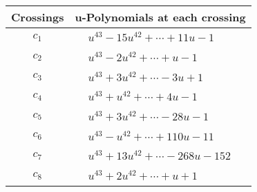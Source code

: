 \documentclass[1p]{elsarticle_modified}
\theoremstyle{definition}
\begin{document}
\begin{tabular}{m{50pt}|m{274pt}}
Crossings & \hspace{64pt}u-Polynomials at each crossing \\
\hline $$\begin{aligned}c_{1}\end{aligned}$$&$\begin{aligned}
&u^{43}-15 u^{42}+\cdots+11 u-1
\end{aligned}$\\
\hline $$\begin{aligned}c_{2}\end{aligned}$$&$\begin{aligned}
&u^{43}-2 u^{42}+\cdots+u-1
\end{aligned}$\\
\hline $$\begin{aligned}c_{3}\end{aligned}$$&$\begin{aligned}
&u^{43}+3 u^{42}+\cdots-3 u+1
\end{aligned}$\\
\hline $$\begin{aligned}c_{4}\end{aligned}$$&$\begin{aligned}
&u^{43}+u^{42}+\cdots+4 u-1
\end{aligned}$\\
\hline $$\begin{aligned}c_{5}\end{aligned}$$&$\begin{aligned}
&u^{43}+3 u^{42}+\cdots-28 u-1
\end{aligned}$\\
\hline $$\begin{aligned}c_{6}\end{aligned}$$&$\begin{aligned}
&u^{43}- u^{42}+\cdots+110 u-11
\end{aligned}$\\
\hline $$\begin{aligned}c_{7}\end{aligned}$$&$\begin{aligned}
&u^{43}+13 u^{42}+\cdots-268 u-152
\end{aligned}$\\
\hline $$\begin{aligned}c_{8}\end{aligned}$$&$\begin{aligned}
&u^{43}+2 u^{42}+\cdots+u+1
\end{aligned}$\\

\end{tabular}
\end{document}

